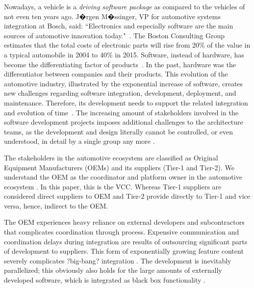 Nowadays, a vehicle is a {\em driving software package} as compared to the vehicles of not even ten years ago. J�rgen M�ssinger, VP for automotive systems integration at Bosch, said: ``Electronics and especially software are the main sources of automotive innovation today."~\cite{Mossinger2010SoftwareAutomotive}. The Boston Consulting Group estimates that the total costs of electronic parts will rise from 20\% of the value in a typical automobile in 2004 to 40\% in 2015. Software, instead of hardware, has become the differentiating factor of products~\cite{ConnectedVehicle2012,hbr2015hardwaresoftware,Mossinger2010SoftwareAutomotive,Broy:2006:CAS:1134285.1134292}. In the past, hardware was the differentiator between companies and their products. This evolution of the automotive industry, illustrated by the exponential increase of software, creates new challenges regarding software integration, development, deployment, and maintenance. Therefore, its development needs to support the related integration and evolution of time~\cite{Broy:2006:CAS:1134285.1134292,Patrizio2016AAF_Chalmers,qualman2009socialnomics,JansenTale2009}. The increasing amount of stakeholders involved in the software development projects imposes additional challenges to the architecture teams, as the development and design literally cannot be controlled, or even understood, in detail by a single group any more \cite{Patrizio2016AAF_Chalmers}. 


The stakeholders in the automotive ecosystem are classified as Original Equipment Manufacturers (OEMs) and its suppliers (Tier-1 and Tier-2). We understand the OEM as the coordinator and platform owner in the automotive ecosystem \cite{KS15,Patrizio2016AAF_Chalmers}. In this paper, this is the VCC. Whereas Tier-1 suppliers are considered direct suppliers to OEM and Tier-2 provide directly to Tier-1 and vice versa, hence, indirect to the OEM. 

The OEM experiences heavy reliance on external developers and subcontractors that complicates coordination through process. Expensive communication and coordination delays during integration are results of outsourcing significant parts of development to suppliers. This form of exponentially growing feature content severely complicates ?big-bang? integration \cite{Eklund2012}. The development is inevitably parallelized; this obviously also holds for the large amounts of externally developed software, which is integrated as black box functionality \cite{Patrizio2016AAF_Chalmers,Broy2009AAF_TUM,Broy:2006:CAS:1134285.1134292}. 

